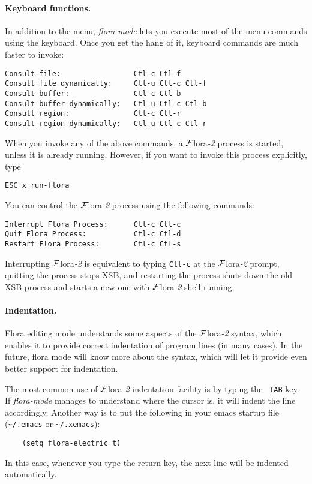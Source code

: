 \documentclass[11pt]{article}
\newcommand{\FLORA}{{\mbox{${\cal F}${\sc lora}\rm\emph{-2}}}\xspace}
\begin{document}
\paragraph{Keyboard functions.}
In addition to the menu, \emph{flora-mode} lets you execute most of the
menu commands using the keyboard. Once you get the hang of it, keyboard
commands are much faster to invoke:
\begin{verbatim}
Consult file:                 Ctl-c Ctl-f
Consult file dynamically:     Ctl-u Ctl-c Ctl-f
Consult buffer:               Ctl-c Ctl-b
Consult buffer dynamically:   Ctl-u Ctl-c Ctl-b
Consult region:               Ctl-c Ctl-r
Consult region dynamically:   Ctl-u Ctl-c Ctl-r
\end{verbatim}
When you invoke any of the above commands, a \FLORA process is started,
unless it is already running. However, if you want to invoke this process
explicitly, type
\begin{verbatim}
ESC x run-flora  
\end{verbatim}
You can control the \FLORA process using the following commands:
\begin{verbatim}
Interrupt Flora Process:      Ctl-c Ctl-c
Quit Flora Process:           Ctl-c Ctl-d
Restart Flora Process:        Ctl-c Ctl-s
\end{verbatim}
Interrupting \FLORA is equivalent to typing {\tt Ctl-c} at the \FLORA
prompt, quitting the process stops XSB, and restarting the process shuts
down the old XSB process and starts a new one with \FLORA shell running.

\paragraph{Indentation.}
Flora editing mode understands some aspects of the \FLORA syntax, which
enables it to provide correct indentation of program lines (in many cases).
In the future, flora mode will know more about the syntax, which will let
it provide even better support for indentation.

The most common use of \FLORA indentation facility is by typing the {\tt
  TAB}-key. If \emph{flora-mode} manages to understand where the cursor is,
it will indent the line accordingly. Another way is to put the following in
your emacs startup file (\verb|~/.emacs| or \verb|~/.xemacs|):
\begin{verbatim}
    (setq flora-electric t)  
\end{verbatim}
In this case, whenever you type the return key, the next line will be
indented automatically.
\end{document}
